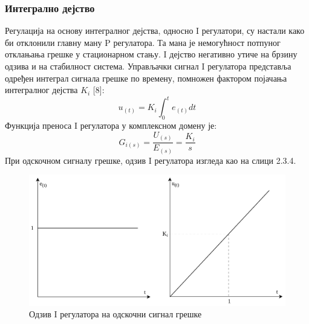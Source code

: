 \documentclass[12pt]{article}
\begin{document}
\subsubsection{Интегрално дејство}
Регулација на основу интегралног дејства, односно I регулатори, су настали како би отклонили главну ману P регулатора. Та мана је немогућност потпуног отклањања грешке у стационарном стању. I дејство негативно утиче на брзину одзива и на стабилност система. Управљачки сигнал I регулатора представља одређен интеграл сигнала грешке по времену, помножен фактором појачања интегралног дејства $K_i$ [8]:
\begin{equation}
    u_{(t)} = K_i\int_{0}^{t}e_{(t)}dt
\end{equation}
Функција преноса I регулатора у комплексном домену је:
\begin{equation}
    G_{i(s)} = \dfrac{U_{(s)}}{E_{(s)}} = \dfrac{K_i}{s}
\end{equation}
При одскочном сигналу грешке, одзив I регулатора изгледа као на слици 2.3.4.
\begin{figure}[H]
    \centering
    \includegraphics[width=13cm]{figures/i.drawio.png}
    \caption{Одзив I регулатора на одскочни сигнал грешке}
    \label{fig:I_одзив}
\end{figure}
\end{document}

